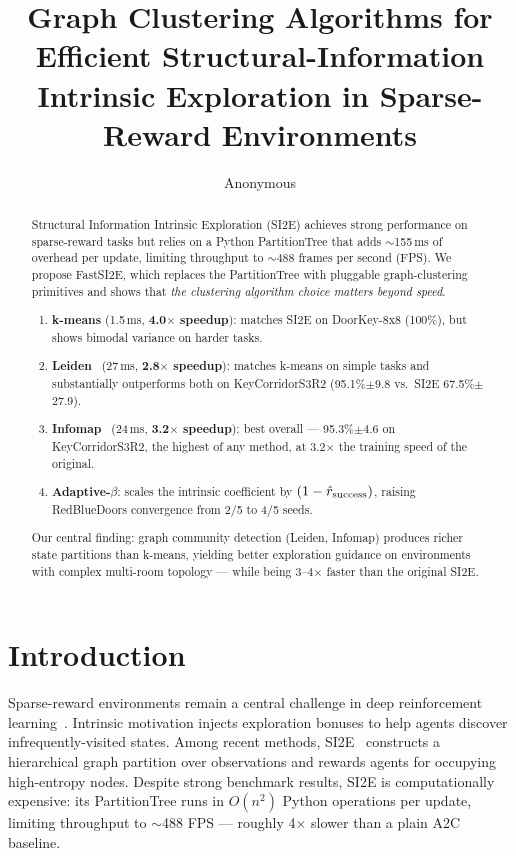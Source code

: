 \documentclass[10pt,twocolumn]{article}
\title{\textbf{Graph Clustering Algorithms for Efficient Structural-Information\\
       Intrinsic Exploration in Sparse-Reward Environments}}
\author{Anonymous}
\date{}
\newcommand{\fastsi}{FastSI2E}
\newcommand{\si}{SI2E}
\newcommand{\ptree}{PartitionTree}
\begin{document}
\maketitle

\begin{abstract}
Structural Information Intrinsic Exploration (\si{}) achieves strong performance on
sparse-reward tasks but relies on a Python \ptree{} that adds $\sim$155\,ms of
overhead per update, limiting throughput to $\sim$488 frames per second (FPS).
We propose \fastsi{}, which replaces the \ptree{} with pluggable graph-clustering
primitives and shows that \emph{the clustering algorithm choice matters beyond speed}.
\begin{enumerate}\itemsep0pt
  \item \textbf{k-means} (1.5\,ms, \textbf{4.0$\times$ speedup}): matches \si{}
    on DoorKey-8x8 (100\%), but shows bimodal variance on harder tasks.
  \item \textbf{Leiden}~\citep{leiden2019} (27\,ms, \textbf{2.8$\times$ speedup}):
    matches k-means on simple tasks and substantially outperforms both on
    KeyCorridorS3R2 (95.1\%$\pm$9.8 vs.\ SI2E 67.5\%$\pm$27.9).
  \item \textbf{Infomap}~\citep{infomap2008} (24\,ms, \textbf{3.2$\times$ speedup}):
    best overall --- 95.3\%$\pm$4.6 on KeyCorridorS3R2, the highest of any method,
    at 3.2$\times$ the training speed of the original.
  \item \textbf{Adaptive-$\beta$}: scales the intrinsic coefficient by
    $(1 - \hat{r}_{\rm success})$, raising RedBlueDoors convergence from
    2/5 to 4/5 seeds.
\end{enumerate}
Our central finding: graph community detection (Leiden, Infomap) produces richer
state partitions than k-means, yielding better exploration guidance on environments
with complex multi-room topology --- while being 3--4$\times$ faster than the
original \si{}.
\end{abstract}

\section{Introduction}

Sparse-reward environments remain a central challenge in deep reinforcement
learning~\citep{a2c2016}. Intrinsic motivation injects exploration bonuses to
help agents discover infrequently-visited states. Among recent methods,
\si{}~\citep{si2e2024} constructs a hierarchical graph partition over observations
and rewards agents for occupying high-entropy nodes. Despite strong benchmark
results, \si{} is computationally expensive: its \ptree{} runs in $O(n^2)$ Python
operations per update, limiting throughput to $\sim$488 FPS --- roughly 4$\times$
slower than a plain A2C baseline.
\end{document}
